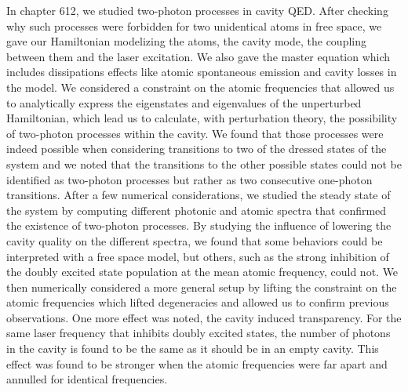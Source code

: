 In chapter 612, we studied two-photon processes in cavity QED. After checking why such processes were forbidden for two unidentical atoms in free space, we gave our Hamiltonian modelizing the atoms, the cavity mode, the coupling between them and the laser excitation. We also gave the master equation which includes dissipations effects like atomic spontaneous emission and cavity losses in the model. We considered a constraint on the atomic frequencies that allowed us to analytically express the eigenstates and eigenvalues of the unperturbed Hamiltonian, which lead us to calculate, with perturbation theory, the possibility of two-photon processes within the cavity. We found that those processes were indeed possible when considering transitions to two of the dressed states of the system and we noted that the transitions to the other possible states could not be identified as  two-photon processes but rather as two consecutive one-photon transitions. After a few numerical considerations, we studied the steady state of the system by computing different photonic and atomic spectra that confirmed the existence of two-photon processes. By studying the influence of lowering the cavity quality on the different spectra, we found that some behaviors could be interpreted with a free space model, but others, such as the strong inhibition of the doubly excited state population at the mean atomic frequency, could not. We then numerically considered  a more general setup by lifting the constraint on the atomic frequencies which lifted degeneracies and allowed us to confirm previous observations. One more effect was noted, the cavity induced transparency. For the same laser frequency that inhibits doubly excited states, the number of photons in the cavity is found to be the same as it should be in an empty cavity. This effect was found to be stronger when the atomic frequencies were far apart and annulled for identical frequencies.

